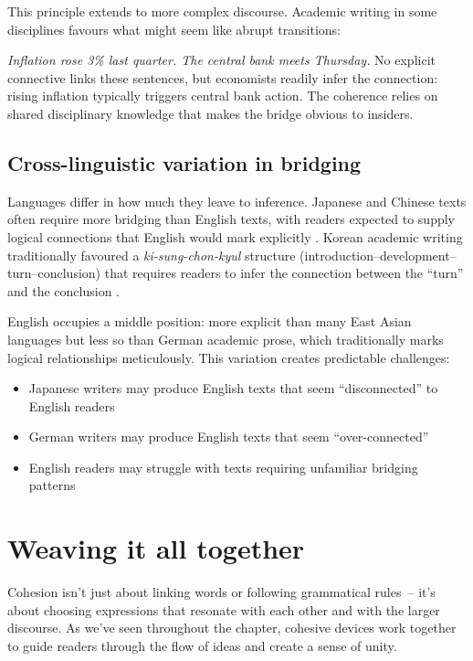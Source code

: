 This principle extends to more complex discourse. Academic writing in some disciplines favours what might seem like abrupt transitions:

\ea
   \textit{Inflation rose 3\% last quarter. The central bank meets Thursday.}
\z
No explicit connective links these sentences, but economists readily infer the connection: rising inflation typically triggers central bank action. The coherence relies on shared disciplinary knowledge that makes the bridge obvious to insiders.

\subsection{Cross-linguistic variation in bridging}

Languages differ in how much they leave to inference. Japanese and Chinese texts often require more bridging than English texts, with readers expected to supply logical connections that English would mark explicitly \citep{Hinds1987}. Korean academic writing traditionally favoured a \textit{ki-sung-chon-kyul} structure (intro\-duction--development--turn--conclusion) that requires readers to infer the connection between the ``turn'' and the conclusion \citep{Kaplan1966}.

English occupies a middle position: more explicit than many East Asian languages but less so than German academic prose, which traditionally marks logical relationships meticulously. This variation creates predictable challenges:

\begin{itemize}[noitemsep]
   \item Japanese writers may produce English texts that seem ``disconnected'' to English readers
   \item German writers may produce English texts that seem ``over-connected''
   \item English readers may struggle with texts requiring unfamiliar bridging patterns
\end{itemize}



\section{Weaving it all together} 

Cohesion isn't just about linking words or following grammatical rules~-- it's about choosing expressions that resonate with each other and with the larger discourse. As we've seen throughout the chapter, cohesive devices work together to guide readers through the flow of ideas and create a sense of unity.

